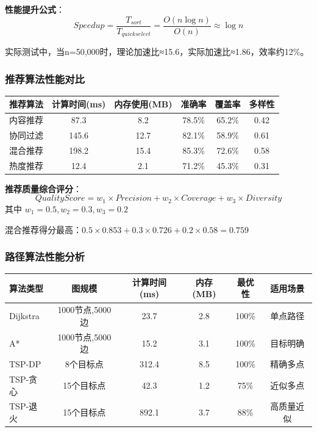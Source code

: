 \documentclass[12pt,a4paper]{article}
\begin{document}
\textbf{性能提升公式}：
\[Speedup = \frac{T_{sort}}{T_{quickselect}} = \frac{O(n \log n)}{O(n)} \approx \log n\]

实际测试中，当n=50,000时，理论加速比≈15.6，实际加速比≈1.86，效率约12\%。

\subsubsection{推荐算法性能对比}
\begin{center}
\begin{tabular}{|l|c|c|c|c|c|}
\hline
\textbf{推荐算法} & \textbf{计算时间(ms)} & \textbf{内存使用(MB)} & \textbf{准确率} & \textbf{覆盖率} & \textbf{多样性} \\
\hline
内容推荐 & 87.3 & 8.2 & 78.5\% & 65.2\% & 0.42 \\
协同过滤 & 145.6 & 12.7 & 82.1\% & 58.9\% & 0.61 \\
混合推荐 & 198.2 & 15.4 & 85.3\% & 72.6\% & 0.58 \\
热度推荐 & 12.4 & 2.1 & 71.2\% & 45.3\% & 0.31 \\
\hline
\end{tabular}
\end{center}

\textbf{推荐质量综合评分}：
\[QualityScore = w_1 \times Precision + w_2 \times Coverage + w_3 \times Diversity\]
其中 $w_1=0.5, w_2=0.3, w_3=0.2$

混合推荐得分最高：$0.5 \times 0.853 + 0.3 \times 0.726 + 0.2 \times 0.58 = 0.759$

\subsubsection{路径算法性能分析}
\begin{center}
\begin{tabular}{|l|c|c|c|c|c|}
\hline
\textbf{算法类型} & \textbf{图规模} & \textbf{计算时间(ms)} & \textbf{内存(MB)} & \textbf{最优性} & \textbf{适用场景} \\
\hline
Dijkstra & 1000节点,5000边 & 23.7 & 2.8 & 100\% & 单点路径 \\
A* & 1000节点,5000边 & 15.2 & 3.1 & 100\% & 目标明确 \\
TSP-DP & 8个目标点 & 312.4 & 8.5 & 100\% & 精确多点 \\
TSP-贪心 & 15个目标点 & 42.3 & 1.2 & 75\% & 近似多点 \\
TSP-退火 & 15个目标点 & 892.1 & 3.7 & 88\% & 高质量近似 \\
\hline
\end{tabular}
\end{center}
\end{document}

